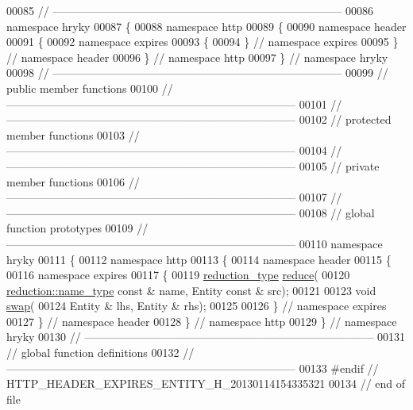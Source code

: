 \begin{DoxyCode}
00085 \textcolor{comment}{//
      ------------------------------------------------------------------------------}
00086 \textcolor{keyword}{namespace }hryky
00087 \{
00088 \textcolor{keyword}{namespace }http
00089 \{
00090 \textcolor{keyword}{namespace }header
00091 \{
00092 \textcolor{keyword}{namespace }expires
00093 \{
00094 \} \textcolor{comment}{// namespace expires}
00095 \} \textcolor{comment}{// namespace header}
00096 \} \textcolor{comment}{// namespace http}
00097 \} \textcolor{comment}{// namespace hryky}
00098 \textcolor{comment}{//
      ------------------------------------------------------------------------------}
00099 \textcolor{comment}{// public member functions}
00100 \textcolor{comment}{//
      ------------------------------------------------------------------------------}
00101 \textcolor{comment}{//
      ------------------------------------------------------------------------------}
00102 \textcolor{comment}{// protected member functions}
00103 \textcolor{comment}{//
      ------------------------------------------------------------------------------}
00104 \textcolor{comment}{//
      ------------------------------------------------------------------------------}
00105 \textcolor{comment}{// private member functions}
00106 \textcolor{comment}{//
      ------------------------------------------------------------------------------}
00107 \textcolor{comment}{//
      ------------------------------------------------------------------------------}
00108 \textcolor{comment}{// global function prototypes}
00109 \textcolor{comment}{//
      ------------------------------------------------------------------------------}
00110 \textcolor{keyword}{namespace }hryky
00111 \{
00112 \textcolor{keyword}{namespace }http
00113 \{
00114 \textcolor{keyword}{namespace }header
00115 \{
00116 \textcolor{keyword}{namespace }expires
00117 \{
00119     \hyperlink{namespacehryky_a343a9a4c36a586be5c2693156200eadc}{reduction_type} \hyperlink{namespacehryky_1_1http_a08fc36a78a8e2908140fcd102829a566}{reduce}(
00120         \hyperlink{namespacehryky_1_1reduction_ac686c30a4c8d196bbd0f05629a6b921f}{reduction::name_type} \textcolor{keyword}{const} & name, Entity \textcolor{keyword}{const} & src);
00121 
00123     \textcolor{keywordtype}{void} \hyperlink{namespacehryky_1_1http_a38e62595ad532d18fbc65ceb61973aec}{swap}(
00124         Entity & lhs, Entity & rhs);
00125 
00126 \} \textcolor{comment}{// namespace expires}
00127 \} \textcolor{comment}{// namespace header}
00128 \} \textcolor{comment}{// namespace http}
00129 \} \textcolor{comment}{// namespace hryky}
00130 \textcolor{comment}{//
      ------------------------------------------------------------------------------}
00131 \textcolor{comment}{// global function definitions}
00132 \textcolor{comment}{//
      ------------------------------------------------------------------------------}
00133 \textcolor{preprocessor}{#endif // HTTP\_HEADER\_EXPIRES\_ENTITY\_H\_20130114154335321}
00134 \textcolor{preprocessor}{}\textcolor{comment}{// end of file}
\end{DoxyCode}

